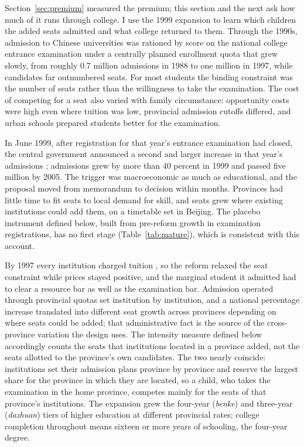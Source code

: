 \documentclass[11pt]{article}
\begin{document}
Section~\ref{sec:premium} measured the premium; this section and the next ask how much of it runs through college. I use the 1999 expansion to learn which children the added seats admitted and what college returned to them. Through the 1990s, admission to Chinese universities was rationed by score on the national college entrance examination under a centrally planned enrollment quota that grew slowly, from roughly 0.7 million admissions in 1988 to one million in 1997, while candidates far outnumbered seats. For most students the binding constraint was the number of seats rather than the willingness to take the examination. The cost of competing for a seat also varied with family circumstance: opportunity costs
were high even where tuition was low, provincial admission cutoffs
differed, and urban schools prepared students better for the
examination.

In June 1999, after registration for that year's entrance examination
had closed, the central government announced a second and larger increase in that year's admissions \citep{LiWhalleyXing2014}; admissions grew by more than 40 percent in 1999 and passed five million by 2005. The trigger was
macroeconomic as much as educational, and the proposal moved from
memorandum to decision within months. Provinces had little time to fit seats to local demand for skill, and seats grew where existing institutions could add
them, on a timetable set in Beijing. The placebo instrument defined below, built from pre-reform growth in examination registrations, has no first stage (Table~\ref{tab:mature}), which is consistent with this account.

By 1997 every institution charged tuition \citep{DongWan2012}, so the reform relaxed the seat
constraint while prices stayed positive, and the marginal student it
admitted had to clear a resource bar as well as the examination bar.
Admission operated through provincial quotas set institution by
institution, and a national percentage increase translated into different
seat growth across provinces depending on where seats could
be added; that administrative fact is the source of the cross-province
variation the design uses. The intensity measure defined below accordingly counts the
seats that institutions located in a province added, not the seats
allotted to the province's own candidates. The two nearly coincide:
institutions set their admission plans province by province and
reserve the largest share for the province in which they are located,
so a child, who takes the examination in the home province, competes
mainly for the seats of that province's institutions. The expansion grew the four-year (\emph{benke}) and three-year (\emph{dazhuan}) tiers of higher education at different provincial rates; college completion throughout means sixteen or more
years of schooling, the four-year degree.
\end{document}
